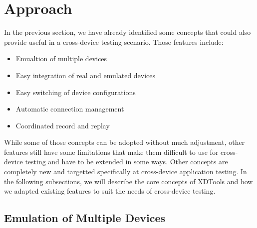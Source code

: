 \chapter{Approach}

In the previous section, we have already identified some concepts that could also provide useful in a cross-device testing scenario. Those features include:
\begin{itemize}
	\item Emualtion of multiple devices
	\item Easy integration of real and emulated devices
	\item Easy switching of device configurations
	\item Automatic connection management
	\item Coordinated record and replay
\end{itemize}

While some of those concepts can be adopted without much adjustment, other features still have some limitations that make them difficult to use for cross-device testing and have to be extended in some ways. Other concepts are completely new and targetted specifically at cross-device application testing. In the following subsections, we will describe the core concepts of XDTools and how we adapted existing features to suit the needs of cross-device testing.

\section{Emulation of Multiple Devices}

